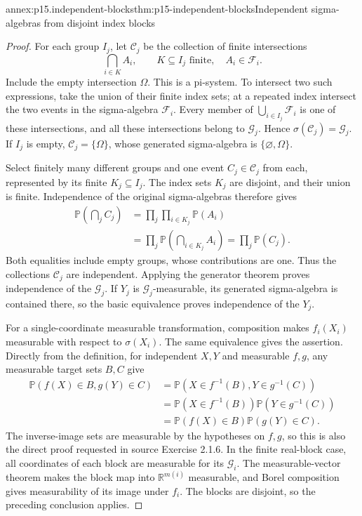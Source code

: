 \begin{annexitem}{annex:p15.independent-blocks}{thm:p15-independent-blocks}{Independent sigma-algebras from disjoint index blocks}
\begin{proof}
For each group \(I_j\), let \(\mathcal C_j\) be the collection
of finite intersections
\[
 \bigcap_{i\in K}A_i,
       \qquad K\subseteq I_j\text{ finite},\quad A_i\in\mathcal F_i.
\]
Include the empty intersection \(\Omega\). This is a pi-system.
To intersect two such expressions, take the union of their finite
index sets; at a repeated index intersect the two events in the
sigma-algebra \(\mathcal F_i\). Every member of
\(\bigcup_{i\in I_j}\mathcal F_i\) is one of these intersections,
and all these intersections belong to \(\mathcal G_j\). Hence
\(\sigma(\mathcal C_j)=\mathcal G_j\). If \(I_j\) is empty,
\(\mathcal C_j=\{\Omega\}\), whose generated sigma-algebra is
\(\{\varnothing,\Omega\}\).

Select finitely many different groups and one event \(C_j\in\mathcal C_j\)
from each, represented by its finite \(K_j\subseteq I_j\).
The index sets \(K_j\) are disjoint, and their union is finite.
Independence of the original sigma-algebras therefore gives
\[
 \begin{aligned}
 \mathbb P\left(\bigcap_j C_j\right)
   &=\prod_j\prod_{i\in K_j}\mathbb P(A_i)\\
   &=\prod_j\mathbb P\left(\bigcap_{i\in K_j}A_i\right)
     =\prod_j\mathbb P(C_j).
 \end{aligned}
\]
Both equalities include empty groups, whose contributions are one.
Thus the collections \(\mathcal C_j\) are independent. Applying
the generator theorem proves independence of the \(\mathcal G_j\).
If \(Y_j\) is \(\mathcal G_j\)-measurable, its generated
sigma-algebra is contained there, so the basic equivalence proves
independence of the \(Y_j\).

For a single-coordinate measurable transformation, composition makes
\(f_i(X_i)\) measurable with respect to \(\sigma(X_i)\).
The same equivalence gives the assertion. Directly from the definition,
for independent \(X,Y\) and measurable \(f,g\), any measurable
target sets \(B,C\) give
\[
 \begin{aligned}
 \mathbb P(f(X)\in B,g(Y)\in C)
   &=\mathbb P(X\in f^{-1}(B),Y\in g^{-1}(C))\\
   &=\mathbb P(X\in f^{-1}(B))\mathbb P(Y\in g^{-1}(C))\\
   &=\mathbb P(f(X)\in B)\mathbb P(g(Y)\in C).
 \end{aligned}
\]
The inverse-image sets are measurable by the hypotheses on \(f,g\),
so this is also the direct proof requested in source Exercise 2.1.6.
In the finite
real-block case, all coordinates of each block are measurable for
its \(\mathcal G_i\). The measurable-vector theorem makes the
block map into \(\mathbb R^{m(i)}\) measurable, and Borel
composition gives measurability of its image under \(f_i\).
The blocks are disjoint, so the preceding conclusion applies.


\end{proof}
\end{annexitem}
